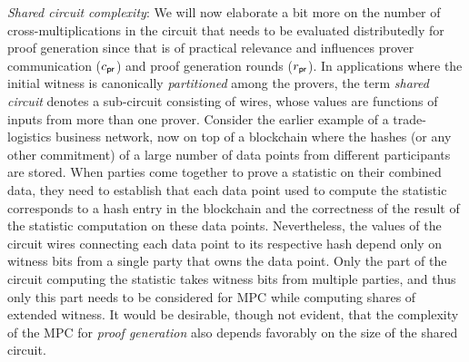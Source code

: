 \noindent\textit{Shared circuit complexity}:
We will now elaborate a bit more on the number of cross-multiplications in the circuit that needs to be evaluated distributedly for proof generation since
that is of practical relevance and influences prover communication ($c_\mathsf{pr}$)
and proof generation rounds ($r_\mathsf{pr}$). In applications where the initial witness is canonically \textit{partitioned} among the provers,  the term \textit{shared circuit} denotes a sub-circuit consisting of wires, whose values are functions of inputs from more than one prover. 
{\color{brown}
Consider the earlier example of a trade-logistics business network, now on top of a blockchain where the hashes (or any other commitment) of a large number of data points from different participants are stored. 
When parties come together to prove a statistic on their combined data, they
need to establish that each data point used to compute the statistic corresponds to a 
hash entry in the blockchain and the correctness of the result of the statistic computation on these data points. Nevertheless, the values of the circuit wires connecting each data point to its respective hash depend only on witness bits from a single party that owns the data point. Only the part of the circuit computing the statistic takes witness bits from multiple parties, and thus only this part needs to be considered for MPC while computing shares of extended witness. It would be desirable, though not evident, that the complexity of the MPC for {\em proof
	generation} also depends favorably on the size of the shared circuit. 
}
